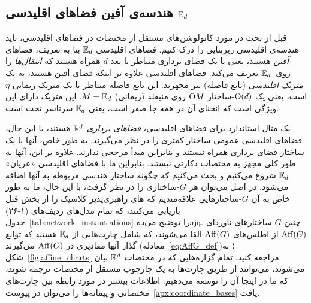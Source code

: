

\subsection
[هندسه‌ی آفین فضاهای اقلیدسی \texorpdfstring{$\Euc_d$}{}]%
{هندسه‌ی آفین فضاهای اقلیدسی $\Euc_d$}
\label{sec:euclidean_geometry}


قبل از بحث در مورد کانولوشن‌های مستقل از مختصات در فضاهای اقلیدسی، باید هندسه‌ی اقلیدسی زیربنایی را درک کنیم.
فضاهای اقلیدسی $\Euc_d$ بنا به تعریف، فضاهای \emph{آفین} هستند، یعنی با یک فضای برداری متناظر با بعد $d$ همراه هستند که \emph{انتقال‌ها} را روی~$\Euc_d$ تعریف می‌کند.
فضاهای اقلیدسی علاوه بر اینکه فضای آفین هستند، به یک \emph{متریک اقلیدسی} (تابع فاصله) نیز مجهزند.
این تابع فاصله متناظر با یک متریک ریمانی $\eta$ است، یعنی یک $\operatorname{O}(d)$-ساختار $\operatorname{O}\mkern-3.6muM$ روی منیفلد (ریمانی) $M=\mathbb{E}_d$.
این متریک دارای این ویژگی است که انحنای آن در همه جا صفر است، یعنی $\Euc_d$ سرتاسر تخت است.


یک مثال استاندارد برای فضاهای اقلیدسی، \emph{فضاهای برداری} $\mathbb{R}^d$ هستند، با این حال، فضاهای اقلیدسی عمومی ساختار کمتری را در نظر می‌گیرند.
به طور خاص، آنها با یک ساختار فضای برداری همراه نیستند و بنابراین مبدأ مرجحی ندارند.
علاوه بر این، آنها به طور کلی مجهز به مختصات دکارتی نیستند.
بنابراین ما با فضاهای اقلیدسی «عریان» $\Euc_d$ شروع می‌کنیم و بحث می‌کنیم که چگونه ساختار هندسی مربوطه به آنها اضافه می‌شود.
در اصل می‌توان هر $G$-ساختاری را در نظر گرفت، با این حال، ما به طور خاص به آن $G$-ساختارهایی علاقه‌مندیم که های راهبری‌پذیر کلاسیک را از بخش قبل بازیابی می‌کنند، که تمام مدل‌های ردیف‌های (۱-۲۶) جدول~\ref{tab:network_instantiations} را توضیح می‌دهają.
چنین $G$-ساختارهای ناوردای $\operatorname{Aff}(G)$ از اطلس‌های $\operatorname{Aff}(G)$ القا می‌شوند، که شامل چارت‌هایی از $\Euc_d$ هستند که توابع گذار آنها مقادیری در $\operatorname{Aff}(G)$ می‌گیرند (معادله~\eqref{eq:AffG_def})؛ به شکل~\ref{fig:affine_charts} مراجعه کنید.
تمام گزاره‌هایی که در مختصات $\mathbb{R}^d$ بیان می‌شوند، می‌توانند از طریق چارت‌ها به یک چارچوب مستقل از مختصات ترجمه شوند، که ما در اینجا آن را توسعه می‌دهیم.
اطلاعات بیشتر در مورد رابطه بین چارت‌های مختصاتی و پیمانه‌ها را می‌توان در پیوست~\ref{apx:coordinate_bases} یافت.

